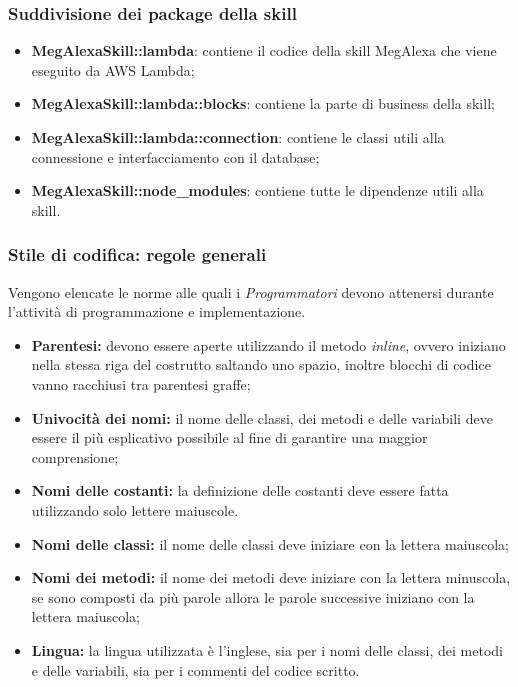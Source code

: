 \subsubsection{Suddivisione dei package della skill}
	\begin{itemize}
		\item \textbf{MegAlexaSkill::lambda}: contiene il codice della skill MegAlexa che viene eseguito da AWS Lambda;
		\item \textbf{MegAlexaSkill::lambda::blocks}: contiene la parte di business della skill;
		\item \textbf{MegAlexaSkill::lambda::connection}: contiene le classi utili alla connessione e interfacciamento con il database;
		\item \textbf{MegAlexaSkill::node\_modules}: contiene tutte le dipendenze utili alla skill.
	\end{itemize}

\subsubsection{Stile di codifica: regole generali} 
Vengono elencate le norme alle quali i \textit{Programmatori} devono attenersi durante l'attività di programmazione e implementazione.
\begin{itemize}
	\item \textbf{Parentesi:} devono essere aperte utilizzando il metodo \textit{inline}, ovvero iniziano nella stessa riga del costrutto saltando uno spazio, inoltre blocchi di codice vanno racchiusi tra parentesi graffe;
	\item \textbf{Univocità dei nomi:} il nome delle classi, dei metodi e delle variabili deve essere il più esplicativo possibile al fine di garantire una maggior comprensione;
	\item \textbf{Nomi delle costanti:} la definizione delle costanti deve essere fatta utilizzando solo lettere maiuscole.
	\item \textbf{Nomi delle classi:} il nome delle classi deve iniziare con la lettera maiuscola;
	\item \textbf{Nomi dei metodi:} il nome dei metodi deve iniziare con la lettera minuscola, se sono composti da più parole allora le parole successive iniziano con la lettera maiuscola;
	\item \textbf{Lingua:} la lingua utilizzata è l'inglese, sia per i nomi delle classi, dei metodi e delle variabili, sia per i commenti del codice scritto.
\end{itemize}


